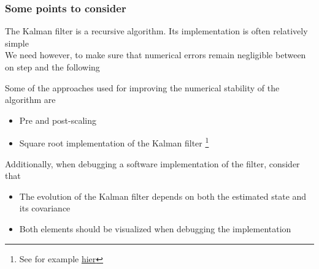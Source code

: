 \begin{frame}
	\frametitle{Some points to consider}
	The Kalman filter is a recursive algorithm. Its implementation is often relatively simple\\\vspace{0.5em}
	We need however, to make sure that numerical errors remain negligible between on step and the following\\\vspace{0.5em}
	
	Some of the approaches used for improving the numerical stability of the algorithm are
	\begin{itemize}\setlength\itemsep{0.5em}
		\item Pre and post-scaling
		\item Square root implementation of the Kalman filter \footnote{See for example \href{https://github.com/mherb/kalman}{hier}}
	\end{itemize}\vspace{1em}
	Additionally, when debugging a software implementation of the filter, consider that 
	\begin{itemize}\setlength\itemsep{0.5em}
		\item The evolution of the Kalman filter depends on both the estimated state and its covariance
		\item Both elements should be visualized when debugging the implementation
	\end{itemize}
\end{frame}

